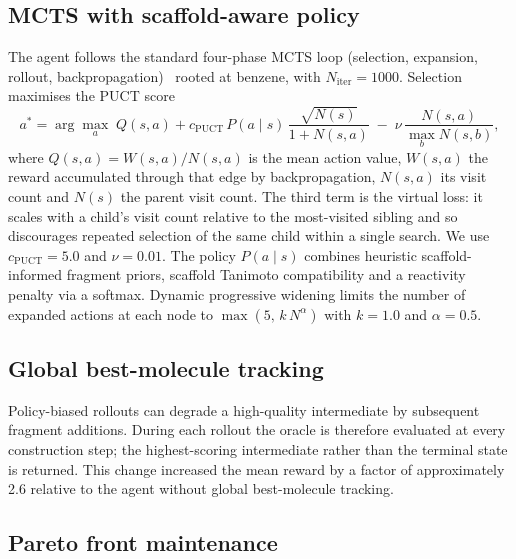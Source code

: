 \documentclass[10pt,a4paper]{article}
\begin{document}
\subsection{MCTS with scaffold-aware policy}
\label{sec:mcts}

The agent follows the standard four-phase MCTS loop (selection, expansion, rollout, backpropagation)~\citep{Coulom2006} rooted at benzene, with $N_{\text{iter}}=\num{1000}$. Selection maximises the PUCT score~\citep{Silver2016}
\begin{equation}
  a^{*} = \arg\max_{a}\;
  Q(s,a)
  + c_{\text{PUCT}}\,P(a\mid s)\,\frac{\sqrt{N(s)}}{1+N(s,a)}
  \;-\; \nu\,\frac{N(s,a)}{\max_{b} N(s,b)},
\end{equation}
where $Q(s,a)=W(s,a)/N(s,a)$ is the mean action value, $W(s,a)$ the reward accumulated through that edge by backpropagation, $N(s,a)$ its visit count and $N(s)$ the parent visit count. The third term is the virtual loss: it scales with a child's visit count relative to the most-visited sibling and so discourages repeated selection of the same child within a single search. We use $c_{\text{PUCT}}=\num{5.0}$ and $\nu=\num{0.01}$. The policy $P(a\mid s)$ combines heuristic scaffold-informed fragment priors, scaffold Tanimoto compatibility and a reactivity penalty via a softmax. Dynamic progressive widening limits the number of expanded actions at each node to $\max(5,\,k\,N^{\alpha})$ with $k=\num{1.0}$ and $\alpha=\num{0.5}$.

\subsection{Global best-molecule tracking}
\label{sec:rollout_fix}

Policy-biased rollouts can degrade a high-quality intermediate by subsequent fragment additions. During each rollout the oracle is therefore evaluated at every construction step; the highest-scoring intermediate rather than the terminal state is returned. This change increased the mean reward by a factor of approximately \num{2.6} relative to the agent without global best-molecule tracking.

\subsection{Pareto front maintenance}
\label{sec:pareto}
\end{document}

